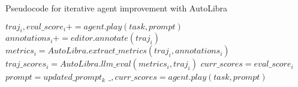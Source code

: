 \begin{algorithm}
	\caption{Pseudocode for iterative agent improvement with AutoLibra}
	\begin{algorithmic}
		[1]   \State $t
		raj_{i}, eval\_score_{i}+= agent.play(task, prompt)$ \State $annotations_{i}+
		= editor.annotate(traj_{i})$ \EndFor \State $metrics_{i}= AutoLibra.extract \_
		metrics(traj_{i}, annotations_{i})$ \State $traj\_scores_{i}= AutoLibra.ll m\_
		eval(metrics_{i}, traj_{i})$ \State $curr\_scores = eval\_score_{i}$ 
		\State $prompt = updated\_prompt_{k}$ 
		\State $\_, curr\_scores = agent.play(task, prompt)$ \EndFor \EndWhile
		\EndFor
	\end{algorithmic}
\end{algorithm}